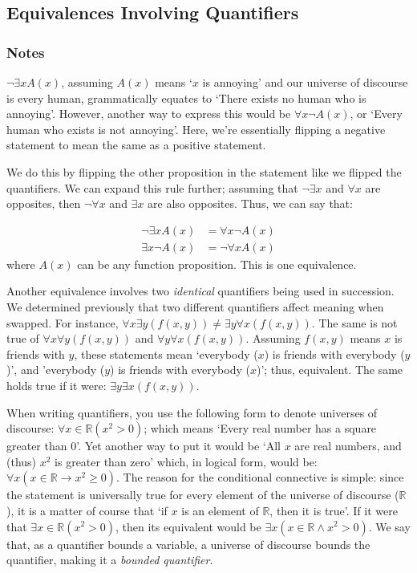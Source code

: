 \documentclass[a4paper, 11pt]{article}
\begin{document}
\clearpage

\subsection{Equivalences Involving Quantifiers}
\subsubsection{Notes}
$\neg \exists xA(x)$, assuming $A(x)$ means `$x$ is annoying' and our universe of discourse is every human, grammatically equates to `There exists no human who is annoying'. However, another way to express this would be $\forall x \neg A(x)$, or `Every human who exists is not annoying'. Here, we're essentially flipping a negative statement to mean the same as a positive statement.

We do this by flipping the other proposition in the statement like we flipped the quantifiers. We can expand this rule further; assuming that $\neg \exists x$ and $\forall x$ are opposites, then $\neg \forall x$ and $\exists x$ are also opposites. Thus, we can say that:


\begin{align*}
  \neg \exists x A(x) & = \forall x \neg A(x) \\
  \exists x \neg A(x) & = \neg \forall x A(x)
\end{align*}
where $A(x)$ can be any function proposition. This is one equivalence.

Another equivalence involves two \textit{identical} quantifiers being used in succession. We determined previously that two different quantifiers affect meaning when swapped. For instance, $\forall x \exists y (f(x, y)) \neq \exists y \forall x (f(x, y))$. The same is not true of $\forall x \forall y (f(x, y))$ and $\forall y \forall x (f(x, y))$. Assuming $f(x, y)$ means $x$ is friends with $y$, these statements mean `everybody ($x$) is friends with everybody ($y$)', and 'everybody ($y$) is friends with everybody ($x$)'; thus, equivalent. The same holds true if it were: $\exists y \exists x (f(x, y))$.

When writing quantifiers, you use the following form to denote universes of discourse: $\forall x \in \mathbb{R} (x^2>0)$; which means `Every real number has a square greater than 0'. Yet another way to put it would be `All $x$ are real numbers, and (thus) $x^2$ is greater than zero' which, in logical form, would be: $\forall x (x \in \mathbb{R} \rightarrow x^2 \ge 0)$. The reason for the conditional connective is simple: since the statement is universally true for every element of the universe of discourse ($\mathbb{R}$), it is a matter of course that `if $x$ is an element of $\mathbb{R}$, then it is true'. If it were that $\exists x \in \mathbb{R} (x^2>0)$, then its equivalent would be $\exists x (x \in \mathbb{R} \wedge x^2 > 0)$. We say that, as a quantifier bounds a variable, a universe of discourse bounds the quantifier, making it a \textit{bounded quantifier}.
\end{document}
